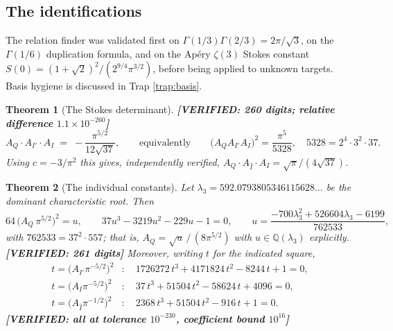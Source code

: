 \documentclass[11pt,reqno]{amsart}
\theoremstyle{plain}
\newtheorem{theorem}{Theorem}[section]
\theoremstyle{definition}
\theoremstyle{remark}
\newcommand{\VER}[1]{{\normalfont\sffamily\bfseries[VERIFIED: #1]}}
\newcommand{\QQ}{\mathbb{Q}}
\newcommand{\Ihat}{\widehat{I}}
\begin{document}
\subsection{The identifications}
The relation finder was validated first on $\Gamma(1/3)\Gamma(2/3)=2\pi/\sqrt3$, on the
$\Gamma(1/6)$ duplication formula, and on the Ap\'ery $\zeta(3)$ Stokes constant
$S(0)=(1+\sqrt2)^2/(2^{9/4}\pi^{3/2})$, before being applied to unknown targets. Basis hygiene is
discussed in Trap \ref{trap:basis}.

\begin{theorem}[The Stokes determinant]\label{thm:det}
\VER{260 digits; relative difference $1.1\times10^{-260}$}
\[
  A_Q\cdot A_{I'}\cdot A_I \;=\; -\frac{\pi^{5/2}}{12\sqrt{37}},
  \qquad\text{equivalently}\qquad
  \bigl(A_QA_{I'}A_I\bigr)^2=\frac{\pi^{5}}{5328},\quad 5328=2^4\cdot3^2\cdot37 .
\]
Using $c=-3/\pi^2$ this gives, independently verified,
$A_Q\cdot A_{\Ihat}\cdot A_I=\sqrt{\pi}/(4\sqrt{37})$.
\end{theorem}

\begin{theorem}[The individual constants]\label{thm:individual}
Let $\lambda_3=592.0793805346115628\ldots$ be the dominant characteristic root. Then
\begin{equation}\label{eq:AQ}
  64\,\bigl(A_Q\,\pi^{5/2}\bigr)^2=u,\qquad
  37u^3-3219u^2-229u-1=0,\qquad
  u=\frac{-700\lambda_3^2+526604\lambda_3-6199}{762533},
\end{equation}
with $762533=37^2\cdot557$; that is, $A_Q=\sqrt{u}\,/\,(8\pi^{5/2})$ with $u\in\QQ(\lambda_3)$
explicitly. \VER{261 digits} Moreover, writing $t$ for the indicated square,
\[
\begin{aligned}
  t=\bigl(A_{I'}\pi^{-5/2}\bigr)^2&:\quad 1726272\,t^3+4171824\,t^2-8244\,t+1=0,\\
  t=\bigl(A_{I}\pi^{-5/2}\bigr)^2&:\quad 37\,t^3+51504\,t^2-58624\,t+4096=0,\\
  t=\bigl(A_{\Ihat}\pi^{-1/2}\bigr)^2&:\quad 2368\,t^3+51504\,t^2-916\,t+1=0 .
\end{aligned}
\]
\VER{all at tolerance $10^{-230}$, coefficient bound $10^{16}$}
\end{theorem}
\end{document}
